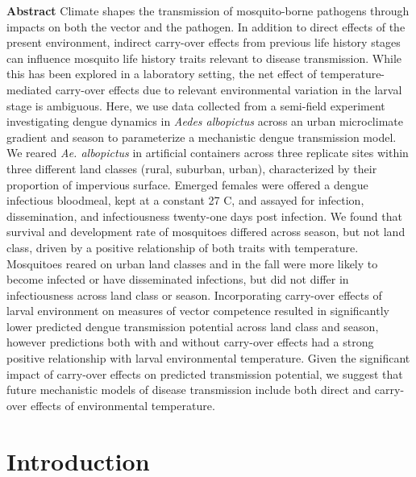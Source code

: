 \documentclass[12pt]{article}
\begin{document}
\textbf{Abstract} Climate shapes the transmission of mosquito-borne pathogens through impacts on both the vector and the pathogen.  In addition to direct effects of the present environment, indirect carry-over effects from previous life history stages can influence mosquito life history traits relevant to disease transmission. While this has been explored in a laboratory setting, the net effect of temperature-mediated carry-over effects due to relevant environmental variation in the larval stage is ambiguous. Here, we use data collected from a semi-field experiment investigating dengue dynamics in \textit{Aedes albopictus} across an urban microclimate gradient and season to parameterize a mechanistic dengue transmission model. We reared \textit{Ae. albopictus} in artificial containers across three replicate sites within three different land classes (rural, suburban, urban), characterized by their proportion of impervious surface. Emerged females were offered a dengue infectious bloodmeal, kept at a constant 27 C, and assayed for infection, dissemination, and infectiousness twenty-one days post infection. We found that survival and development rate of mosquitoes differed across season, but not land class, driven by a positive relationship of both traits with temperature. Mosquitoes reared on urban land classes and in the fall were more likely to become infected or have disseminated infections, but did not differ in infectiousness across land class or season. Incorporating carry-over effects of larval environment on measures of vector competence resulted in significantly lower predicted dengue transmission potential across land class and season, however predictions both with and without carry-over effects had a strong positive relationship with larval environmental temperature. Given the significant impact of carry-over effects on predicted transmission potential, we suggest that future mechanistic models of disease transmission include both direct and carry-over effects of environmental temperature.

\hrulefill

\linenumbers
\doublespacing

\section{Introduction}
\end{document}
